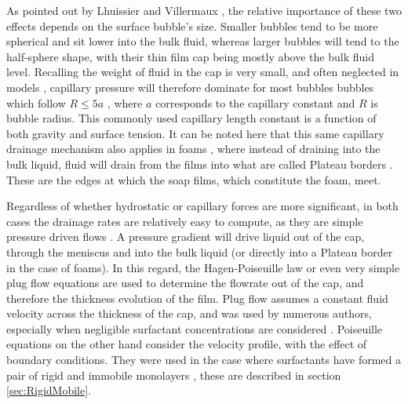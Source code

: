 \documentclass[a4paper,12pt]{article}
\numberwithin{equation}{section}
\numberwithin{figure}{section}
\numberwithin{table}{section}
\begin{document}
As pointed out by Lhuissier and Villermaux \cite{Lhuissier2011}, the relative importance of these two effects depends on the surface bubble's size. Smaller bubbles tend to be more spherical and sit lower into the bulk fluid, whereas larger bubbles will tend to the half-sphere shape, with their thin film cap being mostly above the bulk fluid level. Recalling the weight of fluid in the cap is very small, and often neglected in models \cite{Ida1998}, capillary pressure will therefore dominate for most bubbles bubbles which follow $R	\leq 5a$ \cite{Lhuissier2011}, where $a$ corresponds to the capillary constant and $R$ is bubble radius. This commonly used capillary length constant is a function of both gravity and surface tension. It can be noted here that this same capillary drainage mechanism also applies in foams \cite{Braun2002}, where instead of draining into the bulk liquid, fluid will drain from the films into what are called Plateau borders \cite{Almgren1976}. These are the edges at which the soap films, which constitute the foam, meet.

Regardless of whether hydrostatic or capillary forces are more significant, in both cases the drainage rates are relatively easy to compute, as they are simple pressure driven flows \cite{Lhuissier2011, Nierstrasz1999}. A pressure gradient will drive liquid out of the cap, through the meniscus and into the bulk liquid (or directly into a Plateau border in the case of foams). In this regard, the Hagen-Poiseuille law or even very simple plug flow equations are used to determine the flowrate out of the cap, and therefore the thickness evolution of the film. Plug flow assumes a constant fluid velocity across the thickness of the cap, and was used by numerous authors, especially when negligible surfactant concentrations are considered \cite{Debregeas1998, Lhuissier2011, Breward2002, ChampougnyNotBare2016}. Poiseuille equations on the other hand consider the velocity profile, with the effect of boundary conditions. They were used in the case where surfactants have formed a pair of rigid and immobile monolayers \cite{Nierstrasz1999, Bruinsma1995, Modini2013}, these are described in section \ref{sec:RigidMobile}.
\end{document}
